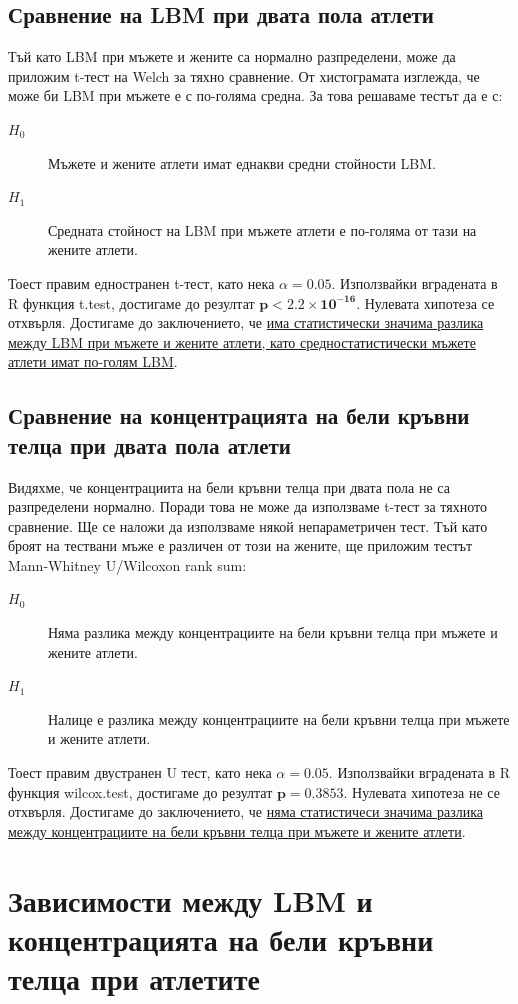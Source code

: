 \documentclass[12pt]{article}
\begin{document}
\begin{large}
\subsection{Сравнение на LBM при двата пола атлети}

Тъй като LBM при мъжете и жените са нормално разпределени, може да приложим t-тест на Welch за тяхно сравнение. От хистограмата изглежда, че може би LBM при мъжете е с по-голяма средна. За това решаваме тестът да е с:
\begin{description}
\item[$H_0$] Мъжете и жените атлети имат еднакви средни стойности LBM. 
\item[$H_1$] Средната стойност на LBM при мъжете атлети е по-голяма от тази на жените атлети.
\end{description}
Тоест правим едностранен t-тест, като нека $\alpha=0.05$. Използвайки вградената в R функция t.test, достигаме до резултат $\mathbf{p<2.2 \times 10^{-16}}$. Нулевата хипотеза се отхвърля. Достигаме до заключението, че \uline{има статистически значима разлика между LBM при мъжете и жените атлети, като средностатистически мъжете атлети имат по-голям LBM}.

\subsection{Сравнение на концентрацията на бели кръвни телца при двата пола атлети}
Видяхме, че концентрациита на бели кръвни телца при двата пола не 
са разпределени нормално. Поради това не може да използваме t-тест за 
тяхното сравнение. Ще се наложи да използваме някой непараметричен 
тест. Тъй като броят на тествани мъже е различен от този на жените, ще 
приложим тестът Mann-Whitney U/Wilcoxon rank sum:
\begin{description}
\item[$H_0$] Няма разлика между концентрациите на бели кръвни телца при мъжете и жените атлети. 
\item[$H_1$] Налице е разлика между концентрациите на бели кръвни телца при мъжете и жените атлети.
\end{description}
Тоест правим двустранен U тест, като нека $\alpha=0.05$. Използвайки 
вградената в R функция wilcox.test, достигаме до резултат $\mathbf{p=0.3853}$. 
Нулевата хипотеза не се отхвърля. Достигаме до заключението, че \uline{няма статистичеси значима разлика между концентрациите на бели кръвни телца при мъжете и жените атлети}.


\section{Зависимости между LBM и концентрацията на бели кръвни телца при атлетите}


\end{large}
\end{document}
